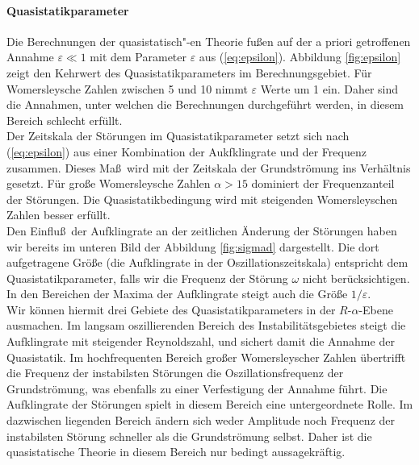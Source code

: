 \documentclass[10pt,a5paper,oneside,draft]{book}
\numberwithin{equation}{chapter}
\begin{document}
\paragraph{Quasistatikparameter}
Die Berechnungen der quasistatisch"-en Theorie fu\ss en auf der a priori getroffenen Annahme $\varepsilon\ll1$ mit dem Parameter $\varepsilon$ aus (\mbox{\ref{eq:epsilon}}).
Abbildung \ref{fig:epsilon} zeigt den Kehrwert des Quasistatikparameters im Berechnungsgebiet.
F\"ur Womersleysche Zahlen zwischen 5 und 10 nimmt $\varepsilon$ Werte um 1 ein.
Daher sind die Annahmen, unter welchen die Berechnungen durchgef\"uhrt werden, in diesem Bereich schlecht erf\"ullt.\\
Der Zeitskala der St\"orungen im Quasistatikparameter setzt sich nach (\mbox{\ref{eq:epsilon}}) aus einer Kombination der Aukfklingrate und der Frequenz zusammen.
Dieses Ma\ss\ wird mit der Zeitskala der Grundstr\"omung ins Verh\"altnis gesetzt.
F\"ur gro\ss e Womersleysche Zahlen $\alpha>15$ dominiert der Frequenzanteil der St\"orungen.
Die Quasistatikbedingung wird mit steigenden Womersleyschen Zahlen besser erf\"ullt.\\
Den Einflu\ss\ der Aufklingrate an der zeitlichen \"Anderung der St\"orungen haben wir bereits im unteren Bild der Abbildung \ref{fig:sigmad} dargestellt.
Die dort aufgetragene Gr\"o\ss e (die Aufklingrate in der Oszillationszeitskala) entspricht dem Quasistatikparameter, falls wir die Frequenz der St\"orung $\omega$ nicht ber\"ucksichtigen.
In den Bereichen der Maxima der Aufklingrate steigt auch die Gr\"o\ss e $1/\varepsilon$.\\
Wir k\"onnen hiermit drei Gebiete des Quasistatikparameters in der $R$-$\alpha$-Ebene ausmachen.
Im langsam oszillierenden Bereich des Instabilit\"atsgebietes steigt die Aufklingrate mit steigender Reynoldszahl, und sichert damit die Annahme der Quasistatik.
Im hochfrequenten Bereich gro\ss er Womersleyscher Zahlen \"ubertrifft die Frequenz der instabilsten St\"orungen die Oszillationsfrequenz der Grundstr\"omung, was ebenfalls zu einer Verfestigung der Annahme f\"uhrt.
Die Aufklingrate der St\"orungen spielt in diesem Bereich eine untergeordnete Rolle.
Im dazwischen liegenden Bereich \"andern sich weder Amplitude noch Frequenz der instabilsten St\"orung schneller als die Grundstr\"omung selbst.
Daher ist die quasistatische Theorie in diesem Bereich nur bedingt aussagekr\"aftig.\\
\end{document}
